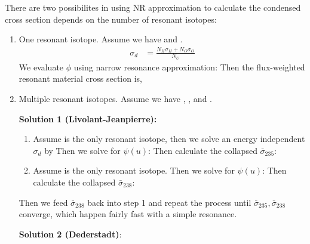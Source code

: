 \documentclass{school-22.211-notes}
\begin{document}
There are two possibilites in using NR approximation to calculate the condensed cross section depends on the number of resonant isotopes: 
\begin{enumerate}
\item One resonant isotope. Assume we have  and . 
\begin{align}
\sigma_d &= \frac{N_H \sigma_H + N_O \sigma_O}{N_U} 
\end{align}
We evaluate $\phi$ using narrow resonance approximation: 
Then the flux-weighted resonant material cross section is,

\item Multiple resonant isotopes. Assume we have , , and . 

  \textbf{Solution 1 (Livolant-Jeanpierre):}
  \begin{enumerate}
  \item Assume  is the only resonant isotope, then we solve an energy independent $\sigma_d$ by 
    Then we solve for $\psi(u)$:
    Then calculate the collapsed $\bar{\sigma}_{235}$:
  \item Assume  is the only resonant isotope. 
    Then we solve for $\psi(u)$:
    Then calculate the collapsed $\bar{\sigma}_{238}$:
  \end{enumerate}
  Then we feed $\bar{\sigma}_{238}$ back into step 1 and repeat the process until $\bar{\sigma}_{235}, \bar{\sigma}_{238}$ converge, which happen fairly fast with a simple resonance. 


\textbf{Solution 2 (Dederstadt)}: 


\end{enumerate}
\end{document}
